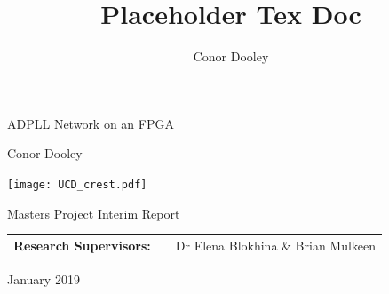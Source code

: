 \documentclass[11pt,english,british]{report}
\begin{document}
\title{Placeholder Tex Doc}
\author{Conor Dooley}
\begin{titlepage}
	
	
	
	\begin{spacing}{3}
		
		\noindent \begin{center}
			
			{\huge{}ADPLL Network on an FPGA}
			\par\end{center}{\huge \par}
	\end{spacing}
	
	\bigskip{}
	
	\begin{center}
		{\Large{}Conor Dooley}
	\end{center}
	
	\vspace{1.25cm}
	
	\begin{center}
		\texttt{[image: UCD\_crest.pdf]}\vspace{0.25cm}
	\end{center}
	
	
	\bigskip{}
	
	\begin{center}
		{\huge{}Masters Project Interim Report }
	\end{center}
	
	\vspace{1.cm}
	
	
	{\Large{}\bigskip{}
		\bigskip{}
	}{\Large \par}
	
	\noindent \begin{center}
		\begin{tabular}{lll}
			\textbf{\large{}Research Supervisors:} & \qquad{}\qquad{} & {\large{}Dr Elena Blokhina \& Brian Mulkeen}\\
		\end{tabular}
		
		\par\end{center}
	
	\vspace{1cm}
	\noindent \begin{center}
		{\large{}January  2019}
		\par\end{center}{\large \par}
	
\end{titlepage}
\setcounter{page}{1} 
\end{document}
